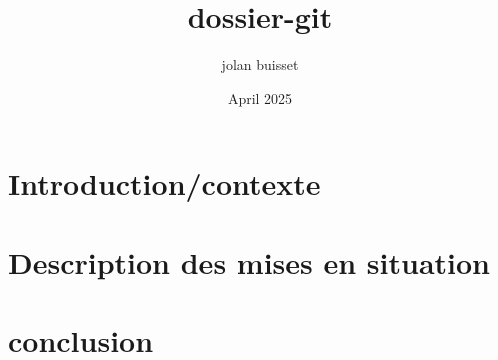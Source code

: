 \documentclass{article}
\title{dossier-git}
\author{jolan buisset}
\date{April 2025}
\begin{document}
\maketitle

\section{Introduction/contexte}



\section{Description des mises en situation}



\section{conclusion}


\end{document}
